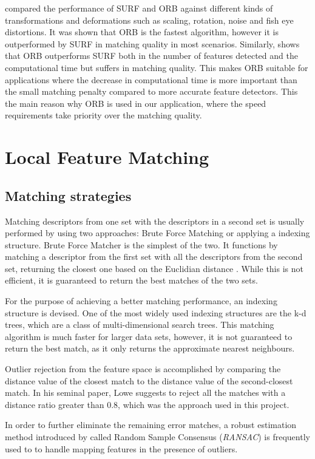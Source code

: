 \documentclass{l4proj}
\begin{document}
\citet{Karami} compared the performance of SURF and ORB against different kinds of transformations and deformations such as scaling, rotation, noise and fish eye distortions. It was shown that ORB is the fastest algorithm, however it is outperformed by SURF in matching quality in most scenarios. Similarly, \citet{Tareen2018ACA} shows that ORB outperforms SURF both in the number of features detected and the computational time but suffers in matching quality. This makes ORB suitable for applications where the decrease in computational time is more important than the small matching penalty compared to more accurate feature detectors. This the main reason why ORB is used in our application, where the speed requirements take priority over the matching quality. 


\section{Local Feature Matching}

\subsection{Matching strategies}
Matching descriptors from one set with the descriptors in a second set is usually performed by using two approaches: Brute Force Matching or applying a indexing structure. Brute Force Matcher is the simplest of the two. It functions by matching a descriptor from the first set with all the descriptors from the second set, returning the closest one based on the Euclidian distance \citep{Lowe04}. While this is not efficient, it is guaranteed to return the best matches of the two sets. 

For the purpose of achieving a better matching performance, an indexing structure is devised. One of the most widely used indexing structures are the k-d trees, which are a class of multi-dimensional search trees. This matching algorithm is much faster for larger data sets, however, it is not guaranteed to return the best match, as it only returns the approximate nearest neighbours. 

Outlier rejection from the feature space is accomplished by comparing the distance value of the closest match to the distance value of the second-closest match. In his seminal paper, Lowe suggests to reject all the matches with a distance ratio greater than 0.8, which was the approach used in this project. 

In order to further eliminate the remaining error matches, a robust estimation method introduced by \citet{Fischler81} called Random Sample Consensus (\textit{RANSAC}) is frequently used to to handle mapping features in the presence of outliers. 
\end{document}
